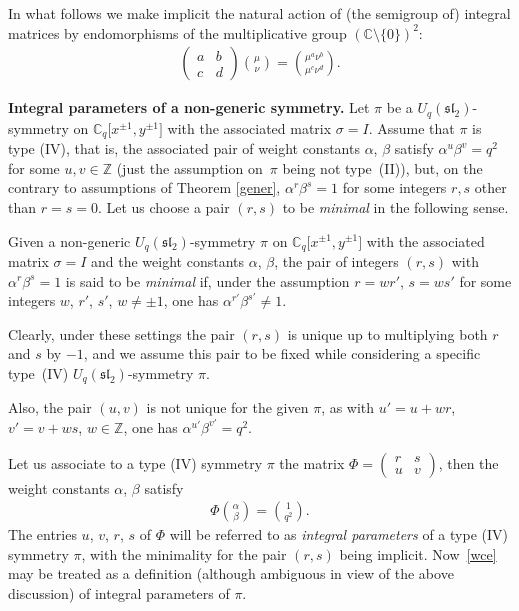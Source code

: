 \documentclass[pdftex]{sigma}
\numberwithin{equation}{section}
\begin{document}
In what follows we make implicit the natural action of (the semigroup of) integral matrices by endomorphisms of the multiplicative group $(\mathbb{C}{\setminus}\{0\})^2$:
\begin{gather}
\begin{pmatrix}a & b\\ c & d\end{pmatrix}\binom\mu\nu=\binom{\mu^a\nu^b}{\mu^c\nu^d}. \label{*}
\end{gather}

{\bf Integral parameters of a non-generic symmetry.} Let $\pi$ be a $U_q(\mathfrak{sl}_2)$-symmetry on $\mathbb{C}_q\big[x^{\pm 1},y^{\pm 1}\big]$ with the associated matrix $\sigma=I$. Assume that $\pi$ is type (IV), that is, the associated pair of weight constants $\alpha$, $\beta$ satisfy $\alpha^u\beta^v=q^2$ for some $u,v\in\mathbb{Z}$ (just the assumption on~$\pi$ being not type~(II)), but, on the contrary to assumptions of Theorem \ref{gener}, $\alpha^r\beta^s=1$ for some integers $r,s$ other than $r=s=0$. Let us choose a pair $(r,s)$ to be {\it minimal} in the following sense.

\begin{Definition}Given a non-generic $U_q(\mathfrak{sl}_2)$-symmetry $\pi$ on $\mathbb{C}_q\big[x^{\pm 1},y^{\pm 1}\big]$ with the associated matrix $\sigma=I$ and the weight constants $\alpha$, $\beta$, the pair of integers $(r,s)$ with $\alpha^r\beta^s=1$ is said to be {\it minimal} if, under the assumption $r=wr'$, $s=ws'$ for some integers $w$, $r'$, $s'$, $w\ne\pm 1$, one has $\alpha^{r'}\beta^{s'}\ne 1$.
\end{Definition}

Clearly, under these settings the pair $(r,s)$ is unique up to multiplying both $r$ and $s$ by $-1$, and we assume this pair to be fixed while considering a specific type~(IV) $U_q(\mathfrak{sl}_2)$-symmetry $\pi$.

Also, the pair $(u,v)$ is not unique for the given $\pi$, as with $u'=u+wr$, $v'=v+ws$, $w\in\mathbb{Z}$, one has $\alpha^{u'}\beta^{v'}=q^2$.

Let us associate to a type (IV) symmetry $\pi$ the matrix $\Phi=\left(\begin{smallmatrix}r & s\\ u & v\end{smallmatrix}\right)$, then
the weight constants $\alpha$, $\beta$ satisfy
\begin{gather}\label{wce}
\Phi\binom{\alpha}{\beta}=\binom{1}{q^2}.
\end{gather}
The entries $u$, $v$, $r$, $s$ of $\Phi$ will be referred to as {\it integral parameters} of a type (IV) symmetry $\pi$, with the minimality for the pair $(r,s)$ being implicit. Now~\eqref{wce} may be treated as a definition (although ambiguous in view of the above discussion) of integral parameters of $\pi$.
\end{document}
